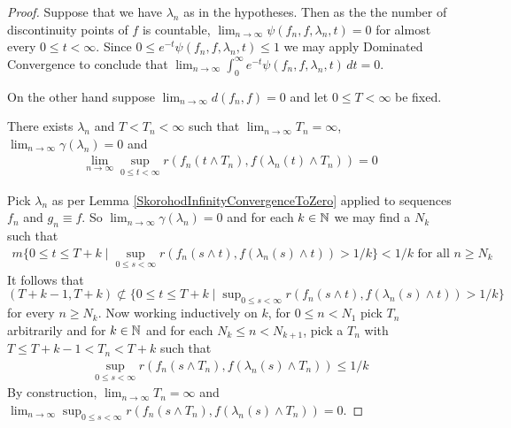 \begin{proof}
Suppose that we have $\lambda_n$ as in the hypotheses.  Then as the the number of discontinuity points of $f$ is countable, $\lim_{n \to \infty} \psi(f_n,f,\lambda_n,t) = 0$ for almost every $0 \leq t < \infty$.   Since
$0 \leq e^{-t} \psi(f_n,f,\lambda_n,t) \leq 1$ we may apply Dominated Convergence to conclude that $\lim_{n \to \infty} \int_0^\infty e^{-t} \psi(f_n,f,\lambda_n,t)  \, dt = 0$.

On the other hand suppose $\lim_{n \to \infty} d(f_n,f) =0$ and let $0 \leq T < \infty$ be fixed.  
\begin{clm}There exists $\lambda_n$ and $T < T_n < \infty$ such that $\lim_{n \to \infty} T_n = \infty$, $\lim_{n \to \infty} \gamma(\lambda_n) = 0$ and 
\begin{align*}
\lim_{n \to \infty} \sup_{0 \leq t < \infty} r(f_n(t \wedge T_n), f(\lambda_n(t) \wedge T_n)) = 0
\end{align*}
\end{clm}
Pick $\lambda_n$ as per Lemma \ref{SkorohodInfinityConvergenceToZero} applied to sequences $f_n$ and $g_n \equiv f$.   So $\lim_{n \to \infty} \gamma(\lambda_n) = 0$ and for each
$k \in \mathbb{N}$ we may find a $N_k$ such that 
\begin{align*}
m \lbrace 0 \leq t \leq T+k \mid \sup_{0 \leq s < \infty} r(f_n(s \wedge t), f(\lambda_n(s) \wedge t)) > 1/k \rbrace < 1/k \text{ for all $n \geq N_k$}
\end{align*}
It follows that $(T+k-1, T+k) \not \subset \lbrace 0 \leq t \leq T+k \mid \sup_{0 \leq s < \infty} r(f_n(s \wedge t), f(\lambda_n(s) \wedge t)) > 1/k \rbrace$ for every $n \geq N_k$.
Now working inductively on $k$, for $0 \leq n < N_1$ pick $T_n$ arbitrarily and for $k \in \mathbb{N}$ and for each $N_k \leq n < N_{k+1}$, pick a $T_n$ with $T \leq T+k-1 < T_n < T+k$ such that 
\begin{align*}
\sup_{0 \leq s < \infty} r(f_{n}(s \wedge T_n), f(\lambda_{n}(s) \wedge T_n)) \leq 1/k
\end{align*}
By construction, $\lim_{n\to \infty} T_n = \infty$ and $\lim_{n \to \infty} \sup_{0 \leq s < \infty} r(f_{n}(s \wedge T_n), f(\lambda_{n}(s) \wedge T_n)) =0$.


\end{proof}

